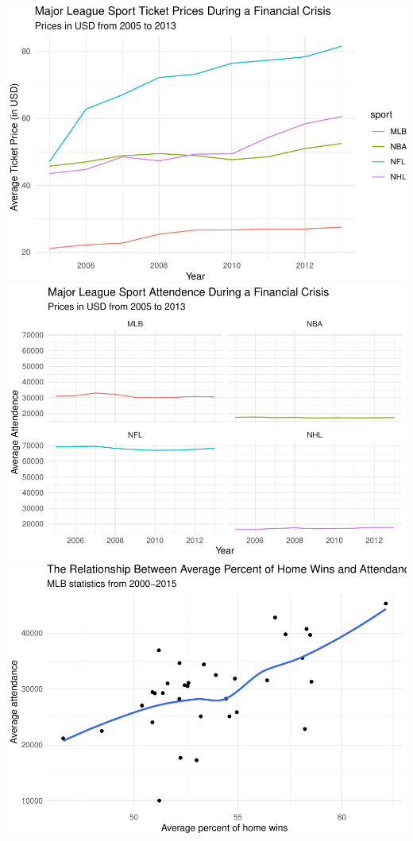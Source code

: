 \documentclass[man, fleqn, noextraspace,floatsintext]{apa6}
\begin{document}
\includegraphics{Final_Project_files/figure-latex/sports_crisis-1.pdf}
\includegraphics{Final_Project_files/figure-latex/sports_crisis-2.pdf}
\includegraphics{Final_Project_files/figure-latex/sports_crisis-3.pdf}
\end{document}

